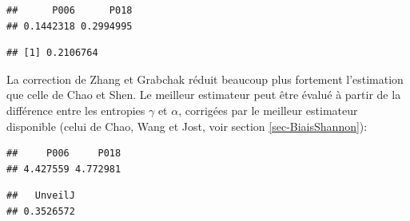 \documentclass[
  11pt,
  french,
  a4paper,
  extrafontsizes,onecolumn,openright
  ]{memoir}
\newenvironment{Shaded}{\begin{snugshade}}{\end{snugshade}}
\newcommand{\AttributeTok}[1]{\textcolor[rgb]{0.13,0.29,0.53}{#1}}
\newcommand{\CommentTok}[1]{\textcolor[rgb]{0.56,0.35,0.01}{\textit{#1}}}
\newcommand{\ConstantTok}[1]{\textcolor[rgb]{0.56,0.35,0.01}{#1}}
\newcommand{\DecValTok}[1]{\textcolor[rgb]{0.00,0.00,0.81}{#1}}
\newcommand{\FunctionTok}[1]{\textcolor[rgb]{0.13,0.29,0.53}{\textbf{#1}}}
\newcommand{\NormalTok}[1]{#1}
\newcommand{\OtherTok}[1]{\textcolor[rgb]{0.56,0.35,0.01}{#1}}
\newcommand{\SpecialCharTok}[1]{\textcolor[rgb]{0.81,0.36,0.00}{\textbf{#1}}}
\begin{document}
\begin{verbatim}
##      P006      P018 
## 0.1442318 0.2994995
\end{verbatim}

\begin{Shaded}
\end{Shaded}

\begin{verbatim}
## [1] 0.2106764
\end{verbatim}

\normalsize

La correction de Zhang et Grabchak réduit beaucoup plus fortement l'estimation que celle de Chao et Shen.
Le meilleur estimateur peut être évalué à partir de la différence entre les entropies \(\gamma\) et \(\alpha\), corrigées par le meilleur estimateur disponible (celui de Chao, Wang et Jost, voir section \ref{sec-BiaisShannon}):

\scriptsize

\begin{Shaded}
\end{Shaded}

\begin{verbatim}
##     P006     P018 
## 4.427559 4.772981
\end{verbatim}

\begin{Shaded}
\end{Shaded}

\begin{verbatim}
##   UnveilJ 
## 0.3526572
\end{verbatim}
\end{document}
